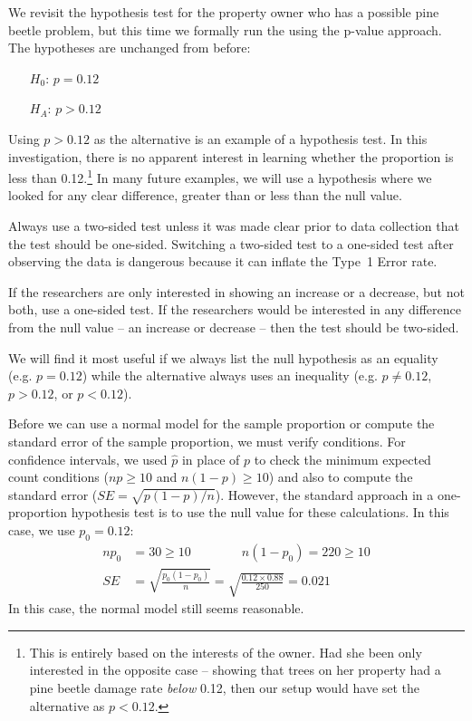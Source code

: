 We revisit the hypothesis test for the property owner who has a possible pine beetle problem, but this time we formally run the  using the p-value approach. The hypotheses are unchanged from before:
\begin{itemize}
\setlength{\itemsep}{0mm}
\item[$H_0$:] $p = 0.12$
\item[$H_A$:] $p > 0.12$
\end{itemize}
Using $p > 0.12$ as the alternative is an example of a  hypothesis test. In this investigation, there is no apparent interest in learning whether the proportion is less than 0.12.\footnote{This is entirely based on the interests of the owner. Had she been only interested in the opposite case -- showing that trees on her property had a pine beetle damage rate \emph{below} 0.12, then our setup would have set the alternative as $p < 0.12$.} In many future examples, we will use a  hypothesis where we looked for any clear difference, greater than or less than the null value.

Always use a two-sided test unless it was made clear prior to data collection that the test should be one-sided. Switching a two-sided test to a one-sided test after observing the data is dangerous because it can inflate the Type~1 Error rate. 

\begin{tipBox}{
If the researchers are only interested in showing an increase or a decrease, but not both, use a one-sided test. If the researchers would be interested in any difference from the null value -- an increase or decrease -- then the test should be two-sided.\vspace{0.5mm}}
\end{tipBox}

\begin{tipBox}{
We will find it most useful if we always list the null hypothesis as an equality (e.g. $p = 0.12$) while the alternative always uses an inequality (e.g. $p \neq 0.12$, $p > 0.12$, or $p < 0.12$).}
\end{tipBox}

Before we can use a normal model for the sample proportion or compute the standard error of the sample proportion, we must verify conditions. For confidence intervals, we used $\hat{p}$ in place of $p$ to check the minimum expected count conditions ($np \geq 10$ and $n(1-p) \geq 10$) and also to compute the standard error ($SE = \sqrt{p (1 - p) / n}$). However, the standard approach in a one-proportion hypothesis test is to use the null value for these calculations. In this case, we use $p_0 = 0.12$:
\begin{align*}
np_0
	&= 30
	\geq 10
	\qquad\qquad
	n(1-p_0)
		= 220
		\geq 10 \\
SE &= \sqrt{\frac{p_0 (1 - p_0)}{n}}
	= \sqrt{\frac{0.12 \times 0.88}{250}}
	= 0.021
\end{align*}
In this case, the normal model still seems reasonable.

